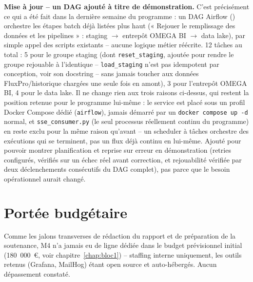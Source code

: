 \textbf{Mise à jour -- un DAG ajouté à titre de démonstration.} C'est
précisément ce qui a été fait dans la dernière semaine du programme :
un DAG Airflow ()
orchestre les étapes batch déjà listées plus haut (« Rejouer le
remplissage des données et les pipelines » : staging $\rightarrow$
entrepôt OMEGA BI $\rightarrow$ data lake), par simple appel des
scripts existants -- aucune logique métier réécrite. 12 tâches au
total : 5 pour le groupe staging (dont \texttt{reset\_staging}, ajoutée
pour rendre le groupe rejouable à l'identique -- \texttt{load\_staging}
n'est pas idempotent par conception, voir son docstring -- sans jamais
toucher aux données FluxPro/historique chargées une seule fois en
amont), 3 pour l'entrepôt OMEGA BI, 4 pour le data lake. Il ne change
rien aux trois raisons ci-dessus, qui restent la position retenue pour
le programme lui-même : le service est placé sous un profil Docker
Compose dédié (\texttt{airflow}), jamais démarré par un
\texttt{docker compose up -d} normal, et \texttt{sse\_consumer.py}
(le seul processus réellement continu du programme) en reste exclu
pour la même raison qu'avant -- un scheduler à tâches orchestre des
exécutions qui se terminent, pas un flux déjà continu en lui-même.
Ajouté pour pouvoir montrer planification et reprise sur erreur en
démonstration (retries configurés, vérifiés sur un échec réel avant
correction, et rejouabilité vérifiée par deux déclenchements
consécutifs du DAG complet), pas parce que le besoin opérationnel
aurait changé.

\section{Portée budgétaire}

Comme les jalons transverses de rédaction du rapport et de préparation
de la soutenance, M4 n'a jamais eu de ligne dédiée dans le budget
prévisionnel initial (180~000~€, voir chapitre~\ref{chap:bloc1}) --
staffing interne uniquement, les outils retenus (Grafana, MailHog)
étant open source et auto-hébergés. Aucun dépassement constaté.
